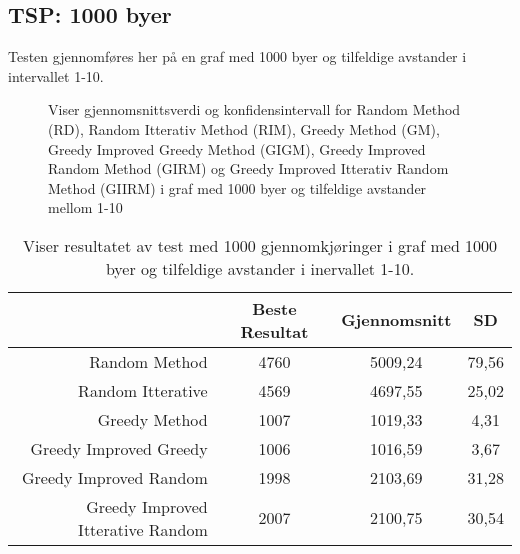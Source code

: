 \documentclass[12pt]{article}
\begin{document}
\subsection{TSP: 1000 byer}
Testen gjennomføres her på en graf med 1000 byer og tilfeldige avstander i intervallet 1-10.
\begin{figure}[h]
\centering
\caption{Viser gjennomsnittsverdi og konfidensintervall for Random Method (RD), Random Itterativ Method (RIM), Greedy Method (GM), Greedy Improved Greedy Method (GIGM), Greedy Improved Random Method (GIRM) og Greedy Improved Itterativ Random Method (GIIRM) i graf med 1000 byer og tilfeldige avstander mellom 1-10}
\end{figure}

\begin{table}[h]
\begin{tabular}{ |r|c|c|c|} 
\hline
  & Beste Resultat & Gjennomsnitt & SD\\ 
 \hline
 Random Method & 4760 & 5009,24& 79,56\\ 
 \hline
 Random Itterative & 4569	 & 4697,55	 & 25,02 \\ 
  \hline
 Greedy Method & 1007 & 1019,33& 4,31\\ 
 \hline
 Greedy Improved Greedy& 1006 & 1016,59 & 3,67 \\ 
 \hline
  Greedy Improved Random& 1998 & 2103,69 & 31,28 \\ 
   \hline
     Greedy Improved Itterative Random& 2007 & 2100,75 & 30,54\\ 
 \hline

 \end{tabular}
\caption{Viser resultatet av test med 1000 gjennomkjøringer i graf med 1000 byer og tilfeldige avstander i inervallet 1-10.}
\end{table}
\newpage
\end{document}
